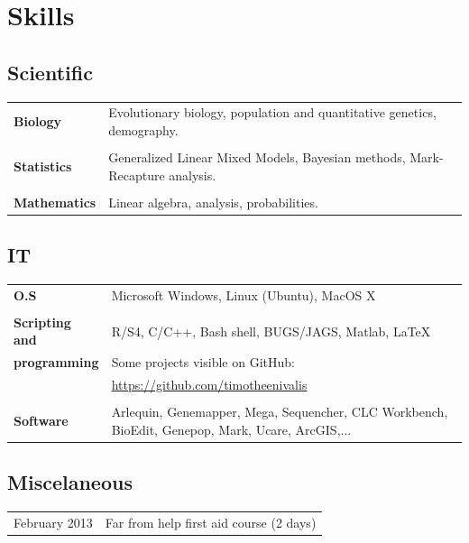 \section{Skills}
\subsection{Scientific}
\begin{tabular}{p{4cm}|p{11cm}}
\hfill \textbf{Biology} & Evolutionary biology, population and quantitative genetics, demography.\\
\multicolumn{2}{c}{} \\
\hfill \textbf{Statistics} & Generalized Linear Mixed Models, Bayesian methods, Mark-Recapture analysis.\\
\multicolumn{2}{c}{} \\
\hfill \textbf{Mathematics} & Linear algebra, analysis, probabilities.\\
\end{tabular}

\subsection{IT}
\begin{tabular}{p{4cm}|p{11cm}}
\hfill \textbf{O.S} & Microsoft Windows, Linux (Ubuntu), MacOS X\\
\multicolumn{2}{c}{} \\
\hfill \textbf{Scripting and} & R/S4, C/C++, Bash shell, BUGS/JAGS, Matlab, \LaTeX\\
\hfill \textbf{programming} & Some projects visible on GitHub: \\
										& \url{https://github.com/timotheenivalis}\\
\multicolumn{2}{c}{} \\
\hfill \textbf{Software} & Arlequin, Genemapper, Mega, Sequencher, CLC Workbench, BioEdit, Genepop, Mark, Ucare, ArcGIS,...\\
\end{tabular}

\subsection{Miscelaneous}
\begin{tabular}{p{4cm}|p{11cm}}
\hfill February 2013 & Far from help first aid course (2 days)\\
\end{tabular}
